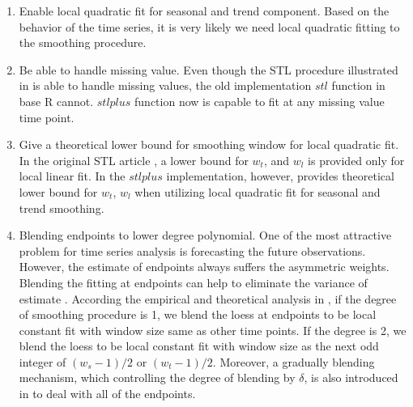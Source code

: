 \begin{enumerate}
\item Enable local quadratic fit for seasonal and trend component. Based on the
behavior of the time series, it is very likely we need local quadratic fitting
to the smoothing procedure.
\item Be able to handle missing value. Even though the STL procedure illustrated
in \cite{Cleveland:1990} is able to handle missing values, the old implementation
$stl$ function in base R cannot. $stlplus$ function now is capable to fit at
any missing value time point.
\item Give a theoretical lower bound for smoothing window for local quadratic fit.
In the original STL article \cite{Cleveland:1990}, a lower bound for $w_t$, and
$w_l$ is provided only for local linear fit. In the $stlplus$ implementation, 
however, \cite{hafen2010local} provides theoretical lower bound for $w_t$, $w_l$ 
when utilizing local quadratic fit for seasonal and trend smoothing.
\item Blending endpoints to lower degree polynomial. One of the most attractive
problem for time series analysis is forecasting the future observations. However,
the estimate of endpoints always suffers the asymmetric weights. Blending the 
fitting at endpoints can help to eliminate the variance of estimate
\cite{hafen2010local}. According the empirical and theoretical analysis in 
\cite{hafen2010local}, if the degree of smoothing procedure is 1, we blend the 
loess at endpoints to be local constant fit with window size same as other time
points. If the degree is 2, we blend the loess to be local constant fit with 
window size as the next odd integer of $(w_s - 1)/2$ or $(w_t - 1)/2$. Moreover,
a gradually blending mechanism, which controlling the degree of blending by 
$\delta$, is also introduced in \cite{hafen2010local} to deal with all of the 
endpoints.
\end{enumerate}

